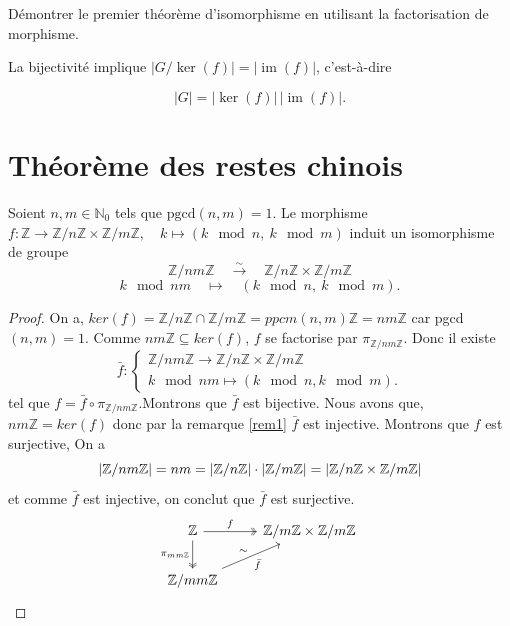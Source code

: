 \begin{exercice}
    Démontrer le premier théorème d'isomorphisme en utilisant la factorisation de morphisme.
\end{exercice}

\begin{remarque}\label{rem1}
        La bijectivité implique $|G / \ker(f)| = |\operatorname{im}(f)|$, c’est-à-dire

\[
\boxed{|G| = |\ker(f)| \, |\operatorname{im}(f)|.}
\]
    \end{remarque}
    
\section{Théorème des restes chinois}

 \begin{theoreme}
        Soient $n,m \in \mathbb{N}_0$ tels que $\text{pgcd}(n,m) = 1$.  
Le morphisme $f : \mathbb{Z} \to \mathbb{Z}/n\mathbb{Z} \times \mathbb{Z}/m\mathbb{Z}, \quad k \mapsto (k \mod n,\: k \mod m)$  
induit un isomorphisme de groupe
\[
\mathbb{Z}/nm\mathbb{Z} \quad \overset{\sim}{\to} \quad \mathbb{Z}/n\mathbb{Z} \times \mathbb{Z}/m\mathbb{Z}
\]
\[
k \mod nm \quad \mapsto \quad (k \mod n,\: k \mod m).
\]
\end{theoreme}

\begin{proof}
    On a, $ker(f)=\mathbb{Z}/n\mathbb{Z}\cap\mathbb{Z}/m\mathbb{Z}=ppcm(n,m)\mathbb{Z}=nm\mathbb{Z}$ car pgcd$(n,m)=1$. Comme $nm\mathbb{Z} \subseteq ker(f)$, $f$ se factorise par $\pi_{\mathbb{Z}/nm\mathbb{Z}}$. Donc il existe 
    \[
\bar{f} :
\begin{cases}
\mathbb{Z}/nm\mathbb{Z} \to \mathbb{Z}/n\mathbb{Z} \times \mathbb{Z}/m\mathbb{Z} \\
k \mod nm \mapsto (k \mod n, k \mod m).
\end{cases}
\]
tel que $f=\bar{f}\circ\pi_{\mathbb{Z}/nm\mathbb{Z}}$.Montrons que $\bar{f}$ est bijective. Nous avons que, $nm\mathbb{Z}=ker(f)$ donc par la remarque \ref{rem1} $\bar{f}$ est injective.
Montrons que $f$ est surjective, 
On a \[
|\mathbb{Z}/nm\mathbb{Z}|=nm=|\mathbb{Z}/n\mathbb{Z}|\cdot|\mathbb{Z}/m\mathbb{Z}|=|\mathbb{Z}/n\mathbb{Z}\times \mathbb{Z}/m\mathbb{Z}|
\]
et comme $\bar{f}$ est injective, on conclut que $\bar{f}$ est surjective.
\[
\begin{tikzcd}
\mathbb{Z} \arrow[r, two heads,"f"] \arrow[d,two heads, "\pi_{mm\mathbb{Z}}"'] 
& \mathbb{Z}/m\mathbb{Z} \times \mathbb{Z}/m\mathbb{Z}  \\
\mathbb{Z}/mm\mathbb{Z} \arrow[ur, "\sim", "\bar{f}"']
\end{tikzcd}
\]
\end{proof}

